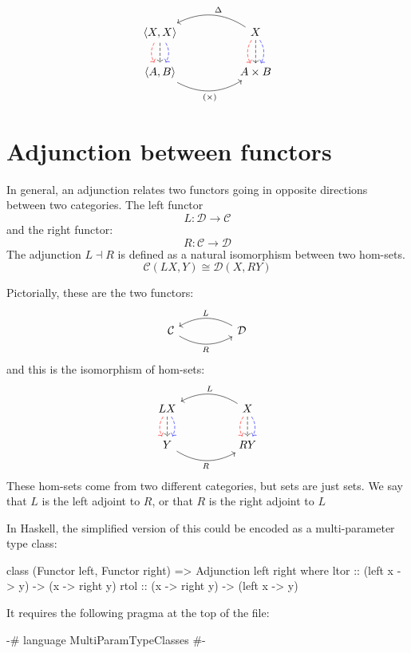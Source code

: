 \documentclass[DaoFP]{subfiles}
\begin{document}
\[
 \begin{tikzcd}
 \langle X, X \rangle
\arrow[d, bend right, red, dashed]
\arrow[d, dashed]
\arrow[d, bend left, blue, dashed]
  &&
  X
\arrow[d, bend right, red, dashed]
\arrow[d, dashed]
\arrow[d, bend left, blue, dashed]
 \arrow[ll, bend right, "\Delta"']
 \\
 \langle A , B \rangle
   \arrow[rr, bend right, "(\times)"']
 &&
 A \times B
  \end{tikzcd}
\]


\section{Adjunction between functors}

In general, an adjunction relates two functors going in opposite directions between two categories. The left functor 
\[ L \colon \mathcal{D} \to \mathcal{C}\]
and the right functor:
\[ R \colon \mathcal{C} \to  \mathcal{D} \]
The adjunction $L \dashv R$ is defined as a natural isomorphism between two hom-sets.
\[  \mathcal{C} (L X, Y) \cong \mathcal{D}( X , R Y)\]

Pictorially, these are the two functors:
\[
 \begin{tikzcd}
  \mathcal{C}
  \arrow[rr, bend right, "R"']
  &&
  \mathcal{D}
  \arrow[ll, bend right, "L"']
  \end{tikzcd}
\]
and this is the isomorphism of hom-sets:
\[
 \begin{tikzcd}
L X
\arrow[d, bend right, red, dashed]
\arrow[d, dashed]
\arrow[d, bend left, blue, dashed]
  &&
  X
\arrow[d, bend right, red, dashed]
\arrow[d, dashed]
\arrow[d, bend left, blue, dashed]
 \arrow[ll, bend right, "L"']
 \\
Y
   \arrow[rr, bend right, "R"']
 &&
 R Y
  \end{tikzcd}
\]
 These hom-sets come from two different categories, but sets are just sets. We say that $L$ is the left adjoint to $R$, or that $R$ is the right adjoint to $L$

In Haskell, the simplified version of this could be encoded as a multi-parameter type class:
\begin{haskell}
class (Functor left, Functor right) => Adjunction left right where
  ltor :: (left x -> y) -> (x -> right y)
  rtol :: (x -> right y) -> (left x -> y)
\end{haskell}
It requires the following pragma at the top of the file:
\begin{haskell}
{-# language MultiParamTypeClasses #-}
\end{haskell}
\end{document}
